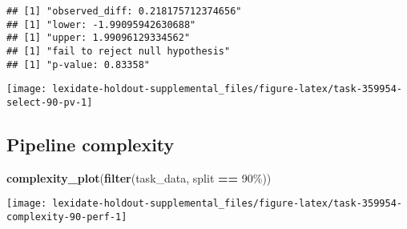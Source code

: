 \documentclass[
]{book}
\newenvironment{Shaded}{\begin{snugshade}}{\end{snugshade}}
\newcommand{\AttributeTok}[1]{\textcolor[rgb]{0.13,0.29,0.53}{#1}}
\newcommand{\DecValTok}[1]{\textcolor[rgb]{0.00,0.00,0.81}{#1}}
\newcommand{\FunctionTok}[1]{\textcolor[rgb]{0.13,0.29,0.53}{\textbf{#1}}}
\newcommand{\NormalTok}[1]{#1}
\newcommand{\OtherTok}[1]{\textcolor[rgb]{0.56,0.35,0.01}{#1}}
\newcommand{\SpecialCharTok}[1]{\textcolor[rgb]{0.81,0.36,0.00}{\textbf{#1}}}
\newcommand{\StringTok}[1]{\textcolor[rgb]{0.31,0.60,0.02}{#1}}
\begin{document}
\begin{Shaded}
\end{Shaded}

\begin{verbatim}
## [1] "observed_diff: 0.218175712374656"
## [1] "lower: -1.99095942630688"
## [1] "upper: 1.99096129334562"
## [1] "fail to reject null hypothesis"
## [1] "p-value: 0.83358"
\end{verbatim}

\texttt{[image: lexidate-holdout-supplemental\_files/figure-latex/task-359954-select-90-pv-1]}

\hypertarget{pipeline-complexity-8}{%
\subsection{Pipeline complexity}\label{pipeline-complexity-8}}

\begin{Shaded}
\begin{Highlighting}[]
\FunctionTok{complexity\_plot}\NormalTok{(}\FunctionTok{filter}\NormalTok{(task\_data, split }\SpecialCharTok{==} \StringTok{\textquotesingle{}90\%\textquotesingle{}}\NormalTok{))}
\end{Highlighting}
\end{Shaded}

\texttt{[image: lexidate-holdout-supplemental\_files/figure-latex/task-359954-complexity-90-perf-1]}
\end{document}
